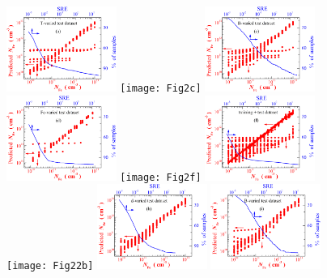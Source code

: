 \documentclass[journal]{IEEEtran}
\begin{document}
\begin{figure}[bt]
\centering
\includegraphics[width=0.32\textwidth]{Fig2b}
\texttt{[image: Fig2c]}
\includegraphics[width=0.32\textwidth]{Fig2d}
\includegraphics[width=0.32\textwidth]{Fig2e}
\texttt{[image: Fig2f]}
\includegraphics[width=0.32\textwidth]{Fig2g}
\texttt{[image: Fig22b]}
\includegraphics[width=0.32\textwidth]{Fig22c}
\includegraphics[width=0.32\textwidth]{Fig22d}

\end{figure}
\end{document}
